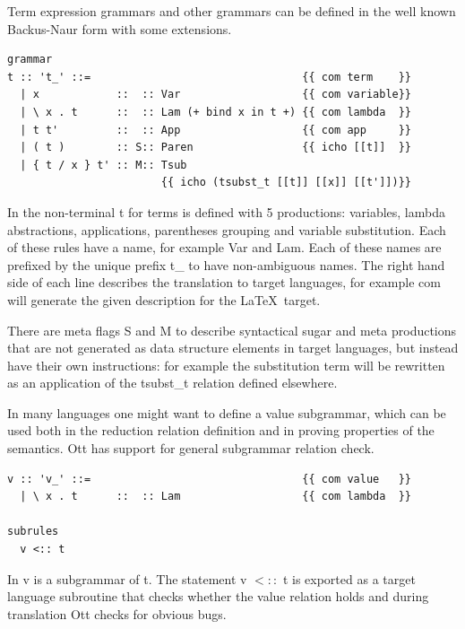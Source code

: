 \documentclass[12pt,twoside,notitlepage]{report}
\begin{document}
Term expression grammars and other grammars can be defined in the well known Backus-Naur form with some extensions.


\begin{lstlisting}[language={Ott}, caption={Ott grammar example}, label={lst:ottgrammarex}]
grammar
t :: 't_' ::=                                 {{ com term    }}
  | x            ::  :: Var                   {{ com variable}}
  | \ x . t      ::  :: Lam (+ bind x in t +) {{ com lambda  }}
  | t t'         ::  :: App                   {{ com app     }}
  | ( t )        :: S:: Paren                 {{ icho [[t]]  }} 
  | { t / x } t' :: M:: Tsub  
                        {{ icho (tsubst_t [[t]] [[x]] [[t']])}}
\end{lstlisting}


In  the non-terminal t for terms is defined with 5 productions: variables, lambda abstractions, applications, parentheses grouping and variable substitution. Each of these rules have a name, for example Var and Lam. Each of these names are prefixed by the unique prefix t\_ to have non-ambiguous names. The right hand side of each line describes the translation to target languages, for example com will  generate the given description for the \LaTeX\, target. 

There are meta flags S and M to describe syntactical sugar and meta productions that are not generated as data structure elements in target languages, but instead have their own instructions: for example the substitution term will be rewritten as an application of the tsubst\_t relation defined elsewhere. 

In many languages one might want to define a value subgrammar, which can be used both in the reduction relation definition and in proving properties of the semantics. Ott has support for general subgrammar relation check.

\begin{lstlisting}[language={Ott}, caption={Ott value subgrammar example}, label={lst:ottvaluesubgrammarexample}]
v :: 'v_' ::=                                 {{ com value   }}
  | \ x . t      ::  :: Lam                   {{ com lambda  }}
  
subrules
  v <:: t
\end{lstlisting}

In  v is a subgrammar of t. The statement v $<::$ t is exported as a target language subroutine that checks whether the value relation holds and during translation Ott checks for obvious bugs.
\end{document}
